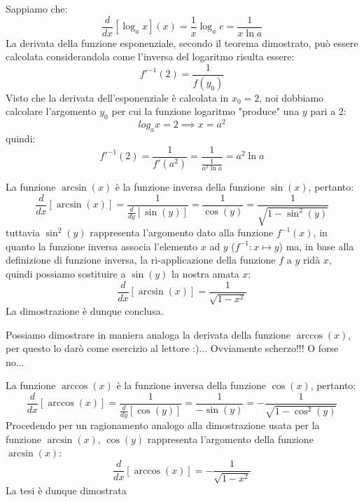 \documentclass{report}
\begin{document}
\par\smallskip\noindent Sappiamo che:
$$
\frac{d}{dx}\left[\log_a x \right](x) = \frac{1}{x} \log_a e = \frac{1}{x\ln a}
$$
La derivata della funzione esponenziale, secondo il teorema dimostrato, può essere calcolata considerandola come l'inversa del logaritmo risulta essere:
$$
f'^{-1}(2) = \frac{1}{f(y_0)} 
$$
Visto che la derivata dell'esponenziale è calcolata in $x_0 = 2$, noi dobbiamo calcolare l'argomento $y_0$ per cui la funzione logaritmo "produce" una $y$ pari a 2:
$$
	log_a x = 2 \implies x = a^2
$$
quindi:
$$
	f'^{-1}(2) = \frac{1}{f'(a^2)} = \frac{1}{\frac{1}{a^2 \ln a}} = a^2\ln a
$$
\begin{myproof}
La funzione $\arcsin(x)$ è la funzione inversa della funzione $\sin(x)$, pertanto:
$$
	\frac{d}{dx}[\arcsin(x)] = \frac{1}{\frac{d}{dy}[\sin(y)]} = \frac{1}{\cos(y)} = \frac{1}{\sqrt{1-\sin^2(y)}}
$$
tuttavia $\sin^2(y)$ rappresenta l'argomento dato alla funzione $f^{-1}(x)$, in quanto la funzione inversa associa l'elemento $x$ ad $y$ ($f^{-1}: x \mapsto y$) ma, in base alla definizione di funzione inversa, la ri-applicazione della funzione $f$ a $y$ ridà $x$, quindi possiamo sostituire a $\sin(y)$ la nostra amata $x$:
$$
\frac{d}{dx}[\arcsin(x)] = \frac{1}{\sqrt{1-x^2}}
$$
La dimostrazione è dunque conclusa.
\end{myproof}
\par\noindent\smallskip Possiamo dimostrare in maniera analoga la derivata della funzione $\arccos(x)$, per questo lo darò come esercizio al lettore :)... Ovviamente scherzo!!! O forse no... \newpage
{}
\begin{myproof}
La funzione $\arccos(x)$ è la funzione inversa della funzione $\cos(x)$, pertanto:
$$
\frac{d}{dx}[\arccos(x)] = \frac{1}{\frac{d}{dy}[\cos(y)]} = \frac{1}{-\sin(y)} = -\frac{1}{\sqrt{1-\cos^2(y)}}
$$
Procedendo per un ragionamento analogo alla dimostrazione usata per la funzione $\arcsin(x)$, $\cos(y)$ rappresenta l'argomento della funzione $\arcsin(x)$:
$$
	\frac{d}{dx}[\arccos(x)] = -\frac{1}{\sqrt{1-x^2}}
$$
La tesi è dunque dimostrata
\end{myproof}
\end{document}
